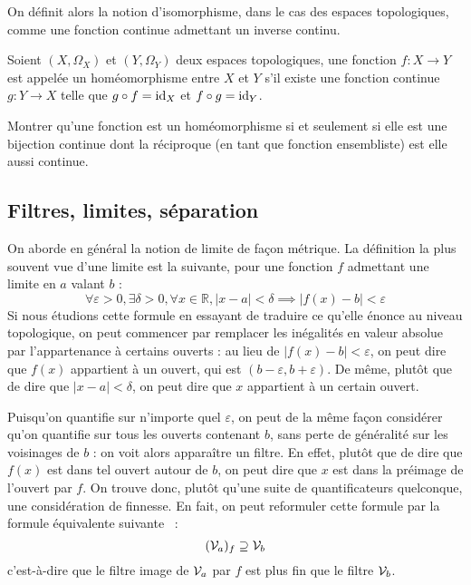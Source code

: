 On définit alors la notion d'isomorphisme, dans le cas des espaces topologiques,
comme une fonction continue admettant un inverse continu.

\begin{definition}[Homéomorphisme]
  Soient $(X,\Omega_X)$ et $(Y,\Omega_Y)$ deux espaces topologiques, une
  fonction $f : X \to Y$ est appelée un homéomorphisme entre $X$ et $Y$ s'il
  existe une fonction continue $g : Y \to X$ telle que $g\circ f = \operatorname{id}_X$ et
  $f\circ g = \operatorname{id}_Y$.
\end{definition}

\begin{exercise}
  Montrer qu'une fonction est un homéomorphisme si et seulement si elle est
  une bijection continue dont la réciproque (en tant que fonction ensembliste)
  est elle aussi continue.
\end{exercise}

\subsection{Filtres, limites, séparation}

On aborde en général la notion de limite de façon métrique. La définition la
plus souvent vue d'une limite est la suivante, pour une fonction $f$ admettant
une limite en $a$ valant $b$ :
\[\forall \varepsilon > 0, \exists \delta > 0, \forall x \in \mathbb R,
|x - a| < \delta \implies |f(x) - b| < \varepsilon\]
Si nous étudions cette formule en essayant de traduire ce qu'elle énonce au
niveau topologique, on peut commencer par remplacer les inégalités en valeur
absolue par l'appartenance à certains ouverts : au lieu de
$|f(x) - b| < \varepsilon$, on peut dire que $f(x)$ appartient à un
ouvert, qui est $(b-\varepsilon,b+\varepsilon)$. De même, plutôt que de dire
que $|x - a| < \delta$, on peut dire que $x$ appartient à un certain ouvert.

Puisqu'on quantifie sur n'importe quel $\varepsilon$, on peut de la même façon
considérer qu'on quantifie sur tous les ouverts contenant $b$, sans perte de
généralité sur les voisinages de $b$ : on voit alors apparaître un filtre.
En effet, plutôt que de dire que $f(x)$ est dans tel ouvert autour de $b$,
on peut dire que $x$ est dans la préimage de l'ouvert par $f$. On trouve donc,
plutôt qu'une suite de quantificateurs quelconque, une considération de
finnesse. En fait, on peut reformuler cette formule par la formule équivalente
suivante~ :
\[(\mathcal{V}_a)_f \supseteq \mathcal{V}_b\]
c'est-à-dire que le filtre image de $\mathcal{V}_a$ par $f$ est plus fin que le filtre
$\mathcal{V}_b$.

